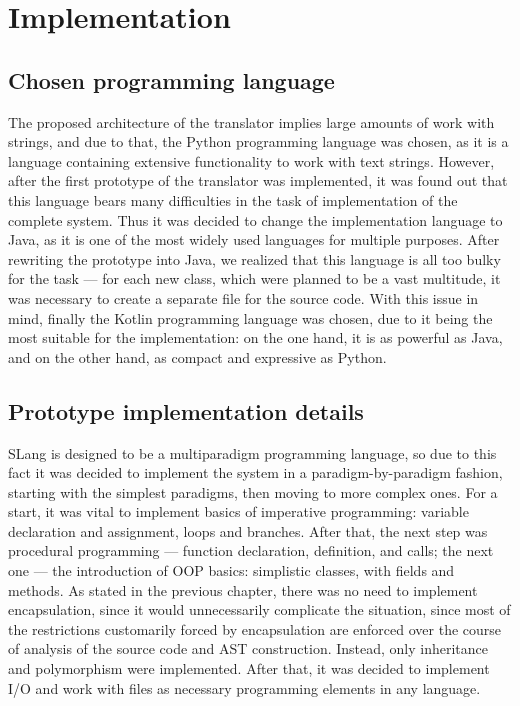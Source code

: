 \chapter{Implementation}
\label{chap:impl}


\section{Chosen programming language}
The proposed architecture of the translator implies large amounts of work with strings, and due to that, the Python programming language was chosen, as it is a language containing extensive functionality to work with text strings.
However, after the first prototype of the translator was implemented, it was found out that this language bears many difficulties in the task of implementation of the complete system. Thus it was decided to change the implementation language to Java, as it is one of the most widely used languages for multiple purposes.
After rewriting the prototype into Java, we realized that this language is all too bulky for the task --- for each new class, which were planned to be a vast multitude, it was necessary to create a separate file for the source code. 
With this issue in mind, finally the Kotlin programming language was chosen, due to it being the most suitable for the implementation: on the one hand, it is as powerful as Java, and on the other hand, as compact and expressive as Python.


\section{Prototype implementation details}
SLang is designed to be a multiparadigm programming language, so due to this fact it was decided to implement the system in a paradigm-by-paradigm fashion, starting with the simplest paradigms, then moving to more complex ones.
For a start, it was vital to implement basics of imperative programming: variable declaration and assignment, loops and branches.
After that, the next step was procedural programming --- function declaration, definition, and calls; the next one --- the introduction of OOP basics: simplistic classes, with fields and methods.
As stated in the previous chapter, there was no need to implement encapsulation, since it would unnecessarily complicate the situation, since most of the restrictions customarily forced by encapsulation are enforced over the course of analysis of the source code and AST construction. Instead, only inheritance and polymorphism were implemented. After that, it was decided to implement I/O and work with files as necessary programming elements in any language.

